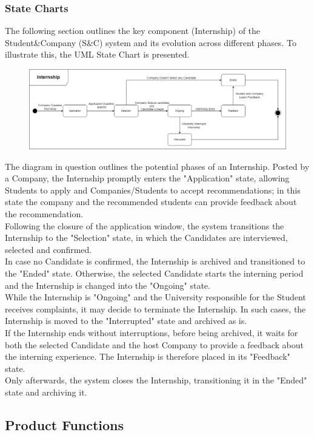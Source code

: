 \documentclass{article}
\begin{document}
\subsubsection{State Charts}
The following section outlines the key component (Internship) of the Student\&Company (S\&C) system and its evolution across different phases. To illustrate this, the UML State Chart is presented.
\begin{figure}[H]
    \centering
    \includegraphics[scale = 0.30]{figures/StateCharts.drawio.png}
    \centering
\end{figure}
The diagram in question outlines the potential phases of an Internship. Posted by a Company, the Internship promptly enters the "Application" state, allowing Students to apply and Companies/Students to accept recommendations; in this state the company and the recommended students can provide feedback about the recommendation.
\\Following the closure of the application window, the system transitions the Internship to the "Selection" state, in which the Candidates are interviewed, selected and confirmed. 
\\In case no Candidate is confirmed, the Internship is archived and transitioned to the "Ended" state. Otherwise, the selected Candidate starts the interning period and the Internship is changed into the "Ongoing" state. 
\\While the Internship is "Ongoing" and the University responsible for the Student receives complaints, it may decide to terminate the Internship. In such cases, the Internship is moved to the "Interrupted" state and archived as is.
\\If the Internship ends without interruptions, before being archived, it waits for both the selected Candidate and the host Company to provide a feedback about the interning experience. The Internship is therefore placed in its "Feedback" state.
\\Only afterwards, the system closes the Internship, transitioning it in the "Ended" state and archiving it.


\subsection{Product Functions}
\end{document}
